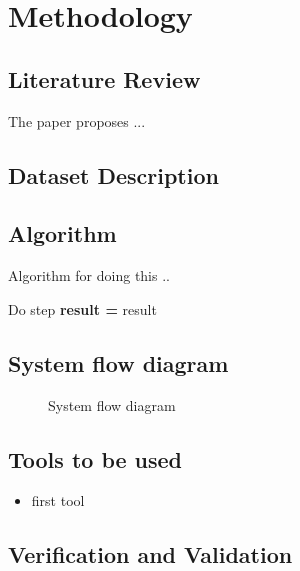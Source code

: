 \chapter{Methodology}\label{ch:methodology}
\section{Literature Review}
The paper \cite{test_cite1} proposes ... 

\section{Dataset Description}

\section{Algorithm}

\begin{algorithm}
  \caption{Algorithm for doing this ..}\label{algorithm}
  \begin{algorithmic}[1]
        \State Do step 
     \EndFor
      \State \textbf{result = }   result 
  \end{algorithmic}
\end{algorithm}

\section{System flow diagram}
\begin{figure}[H]
\centering
\caption{\label{fig:flowchart} System flow diagram }
\end{figure}
\vspace{3cm}
\section{Tools to be used}
\begin{itemize}
\item first tool
\end{itemize}

\section{Verification and Validation}








